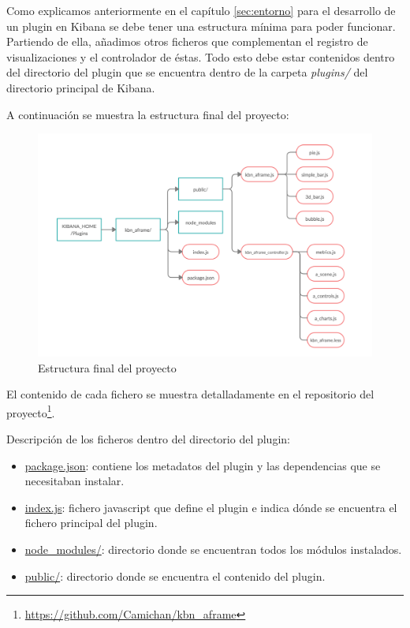 \documentclass[a4paper, 12pt]{book}
\begin{document}
Como explicamos anteriormente en el capítulo \ref{sec:entorno} para el desarrollo de un plugin en Kibana se debe tener una estructura mínima para poder funcionar. Partiendo de ella, añadimos otros ficheros que complementan el registro de visualizaciones y el controlador de éstas. Todo esto debe estar contenidos dentro del directorio del plugin que se encuentra dentro de la carpeta \textit{plugins/} del directorio principal de Kibana. 

A continuación se muestra la estructura final del proyecto:

\begin{figure}[H]
  \centering
  \includegraphics[width=12cm, keepaspectratio]{img/development/estructura-final.png}
  \caption{Estructura final del proyecto}
  \label{fig:arquitecturaproyecto}
\end{figure}

El contenido de cada fichero se muestra detalladamente en el repositorio del proyecto\footnote{\url{https://github.com/Camichan/kbn_aframe}}.

Descripción de los ficheros dentro del directorio del plugin:

\begin{itemize}
    \item \underline{package.json}: contiene los metadatos del plugin y las dependencias que se necesitaban instalar.
    \item \underline{index.js}: fichero javascript que define el plugin e indica dónde se encuentra el fichero principal del plugin.
    \item \underline{node\_modules/}: directorio donde se encuentran todos los módulos instalados.
    \item \underline{public/}: directorio donde se encuentra el contenido del plugin.
\end{itemize}
\end{document}

